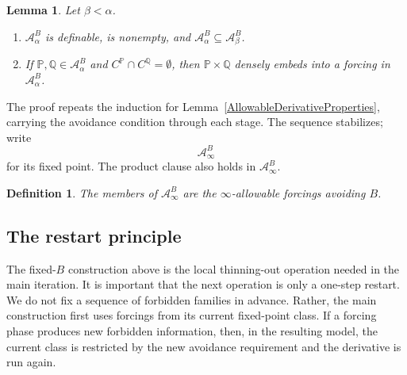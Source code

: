 \documentclass[a4paper,11pt]{article}
\newtheorem{lemma}[theorem]{Lemma}
\newtheorem{definition}[theorem]{Definition}
\newcommand{\forceP}{\mathbb{P}}
\newcommand{\forceQ}{\mathbb{Q}}
\begin{document}
\begin{lemma}\label{AvoidingBProperties}
Let $\beta<\alpha$.
\begin{enumerate}
\item $\mathcal A^B_\alpha$ is definable, is nonempty, and $\mathcal A^B_\alpha\subseteq\mathcal A^B_\beta$.
\item If $\forceP,\forceQ\in\mathcal A^B_\alpha$ and $C^{\forceP}\cap C^{\forceQ}=\emptyset$, then $\forceP\times\forceQ$ densely embeds into a forcing in $\mathcal A^B_\alpha$.
\end{enumerate}
\end{lemma}

The proof repeats the induction for Lemma~\ref{AllowableDerivativeProperties}, carrying the avoidance condition through each stage. The sequence stabilizes; write
\[
\mathcal A^B_\infty
\]
for its fixed point. The product clause also holds in $\mathcal A^B_\infty$.

\begin{definition}\label{inftallowableAvoidingB}
The members of $\mathcal A^B_\infty$ are the $\infty$-allowable forcings avoiding $B$.
\end{definition}

\subsection{The restart principle}

The fixed-$B$ construction above is the local thinning-out operation needed in the main iteration. It is important that the next operation is only a one-step restart. We do not fix a sequence of forbidden families in advance. Rather, the main construction first uses forcings from its current fixed-point class. If a forcing phase produces new forbidden information, then, in the resulting model, the current class is restricted by the new avoidance requirement and the derivative is run again.
\end{document}
